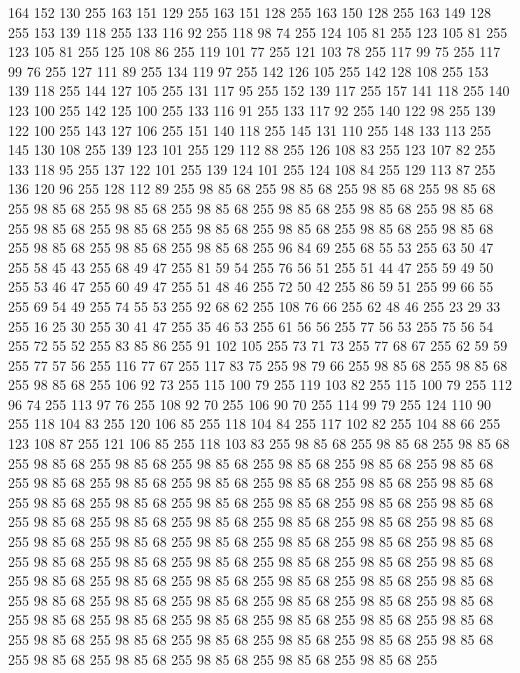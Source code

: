 164 152 130 255 163 151 129 255 163 151 128 255 163 150 128 255 163 149 128 255 153 139 118 255 133 116 92 255 118 98 74 255 124 105 81 255 123 105 81 255 123 105 81 255 125 108 86 255 119 101 77 255 121 103 78 255 117 99 75 255 117 99 76 255 127 111 89 255 134 119 97 255 142 126 105 255 142 128 108 255 153 139 118 255 144 127 105 255 131 117 95 255 152 139 117 255 157 141 118 255 140 123 100 255 142 125 100 255 133 116 91 255 133 117 92 255 140 122 98 255 139 122 100 255 143 127 106 255 151 140 118 255 145 131 110 255 148 133 113 255 145 130 108 255 139 123 101 255 129 112 88 255 126 108 83 255 123 107 82 255 133 118 95 255 137 122 101 255 139 124 101 255 124 108 84 255 129 113 87 255 136 120 96 255 128 112 89 255 98 85 68 255 98 85 68 255 98 85 68 255 98 85 68 255 98 85 68 255 98 85 68 255 98 85 68 255 98 85 68 255 98 85 68 255 98 85 68 255 98 85 68 255 98 85 68 255 98 85 68 255 98 85 68 255 98 85 68 255 98 85 68 255 98 85 68 255
98 85 68 255 98 85 68 255 96 84 69 255 68 55 53 255 63 50 47 255 58 45 43 255 68 49 47 255 81 59 54 255 76 56 51 255 51 44 47 255 59 49 50 255 53 46 47 255 60 49 47 255 51 48 46 255 72 50 42 255 86 59 51 255 99 66 55 255 69 54 49 255 74 55 53 255 92 68 62 255 108 76 66 255 62 48 46 255 23 29 33 255 16 25 30 255 30 41 47 255 35 46 53 255 61 56 56 255 77 56 53 255 75 56 54 255 72 55 52 255 83 85 86 255 91 102 105 255 73 71 73 255 77 68 67 255 62 59 59 255 77 57 56 255 116 77 67 255 117 83 75 255 98 79 66 255 98 85 68 255 98 85 68 255 98 85 68 255 106 92 73 255 115 100 79 255 119 103 82 255 115 100 79 255 112 96 74 255 113 97 76 255 108 92 70 255 106 90 70 255 114 99 79 255 124 110 90 255 118 104 83 255 120 106 85 255 118 104 84 255 117 102 82 255 104 88 66 255 123 108 87 255 121 106 85 255 118 103 83 255 98 85 68 255 98 85 68 255 98 85 68 255 98 85 68 255
98 85 68 255 98 85 68 255 98 85 68 255 98 85 68 255 98 85 68 255 98 85 68 255 98 85 68 255 98 85 68 255 98 85 68 255 98 85 68 255 98 85 68 255 98 85 68 255 98 85 68 255 98 85 68 255 98 85 68 255 98 85 68 255 98 85 68 255 98 85 68 255 98 85 68 255 98 85 68 255 98 85 68 255 98 85 68 255 98 85 68 255 98 85 68 255 98 85 68 255 98 85 68 255 98 85 68 255 98 85 68 255 98 85 68 255 98 85 68 255 98 85 68 255 98 85 68 255 98 85 68 255 98 85 68 255 98 85 68 255 98 85 68 255 98 85 68 255 98 85 68 255 98 85 68 255 98 85 68 255 98 85 68 255 98 85 68 255 98 85 68 255 98 85 68 255 98 85 68 255 98 85 68 255 98 85 68 255 98 85 68 255 98 85 68 255 98 85 68 255 98 85 68 255 98 85 68 255 98 85 68 255 98 85 68 255 98 85 68 255 98 85 68 255 98 85 68 255 98 85 68 255 98 85 68 255 98 85 68 255 98 85 68 255 98 85 68 255 98 85 68 255 98 85 68 255
